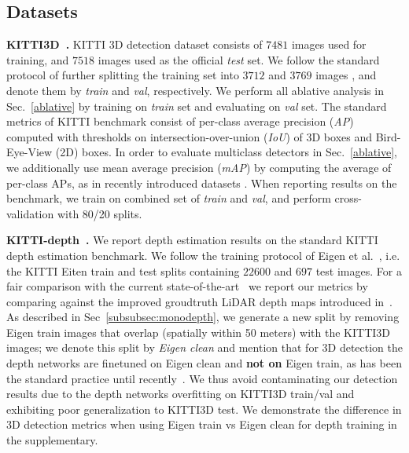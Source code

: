 

\subsection{Datasets}

\noindent\textbf{KITTI3D~\cite{geiger2012we}.} KITTI 3D detection dataset consists of $7481$ images used for training, and $7518$ images used as the official \emph{test} set. We follow the standard protocol of further splitting the training set into $3712$ and $3769$ images \cite{}, and denote them by \emph{train} and \emph{val}, respectively. We perform all ablative analysis in Sec.~\ref{ablative}  by training on \emph{train} set and evaluating on \emph{val} set. The standard metrics of KITTI benchmark consist of per-class average precision (\emph{AP}) computed with thresholds on intersection-over-union (\emph{IoU}) of 3D boxes and Bird-Eye-View (2D) boxes. In order to evaluate multiclass detectors in Sec.~\ref{ablative}, we additionally use mean average precision (\emph{mAP}) by computing the average of per-class APs, as in recently introduced datasets \cite{caesar2020nuscenes, gahlert2020cityscapes}.  When reporting results on the benchmark, we train on combined set of \emph{train} and \emph{val}, and perform cross-validation with 80/20 splits.

\noindent\textbf{KITTI-depth~\cite{geiger2013vision}.} We report depth estimation results on the standard KITTI depth estimation benchmark. We follow the training protocol of Eigen et al.~\cite{eigen2014depth}, i.e. the KITTI Eiten train and test splits containing $22600$ and $697$ test images. For a fair comparison with the current state-of-the-art~\cite{ma2019accurate,fu2018deep} we report our metrics by comparing against the improved groudtruth LiDAR depth maps introduced in~\cite{geiger2013vision}. As described in Sec~\ref{subsubsec:monodepth}, we generate a new split by removing Eigen train images that overlap (spatially within 50 meters) with the KITTI3D images; we denote this split by \textit{Eigen clean} and mention that for 3D detection the depth networks are finetuned on Eigen clean and \textbf{not on} Eigen train, as has been the standard practice until recently~\cite{simonelli2020demystifying}. We thus avoid contaminating our detection results due to the depth networks overfitting on KITTI3D train/val and exhibiting poor generalization to KITTI3D test. We demonstrate the difference in 3D detection metrics when using Eigen train vs Eigen clean for depth training in the supplementary.

